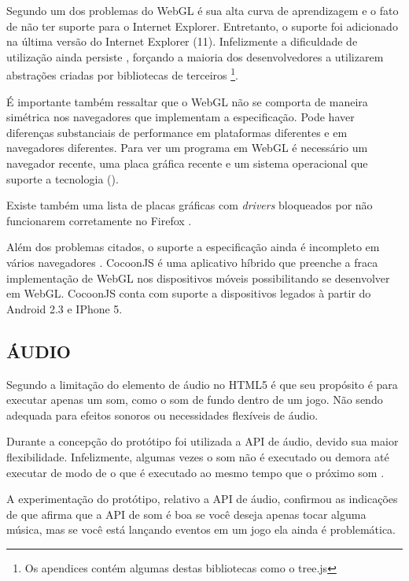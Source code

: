 Segundo \citet{html5mostwanted} um dos problemas do WebGL é sua alta
curva de aprendizagem e o fato de não ter suporte para o Internet
Explorer. Entretanto, o suporte foi adicionado na última versão do
Internet Explorer (11). Infelizmente a dificuldade de utilização
ainda persiste , forçando a maioria dos desenvolvedores a utilizarem
abstrações criadas por bibliotecas de terceiros \footnote{Os apendices
contém algumas destas bibliotecas como o tree.js}.

É importante também ressaltar que o WebGL não se comporta de maneira
simétrica nos navegadores que implementam a especificação. Pode haver
diferenças substanciais de performance em plataformas diferentes e em
navegadores diferentes. Para ver um programa em WebGL é necessário um
navegador recente, uma placa gráfica recente e um sistema operacional
que suporte a tecnologia \autocite{html5mostwanted} ().

Existe também uma lista de placas gráficas com \textit{drivers}
bloqueados por não funcionarem corretamente no Firefox
\autocite[p.42]{3daps}.

Além dos problemas citados, o suporte a especificação ainda é
incompleto em vários navegadores .
CocoonJS é uma aplicativo híbrido que preenche a fraca implementação
de WebGL nos dispositivos móveis possibilitando se desenvolver em
WebGL. CocoonJS conta com suporte a dispositivos legados à partir do
Android 2.3 e IPhone 5.

\subsection{ÁUDIO}

Segundo \citet{html5mostwanted} a limitação do elemento de áudio no
HTML5 é que seu propósito é para executar apenas um som, como o som
de fundo dentro de um jogo. Não sendo adequada para efeitos sonoros
ou necessidades flexíveis de áudio.

Durante a concepção do protótipo foi utilizada a API de áudio, devido
sua maior flexibilidade. Infelizmente, algumas vezes o som não é
executado ou demora até executar de modo de o que é executado ao mesmo
tempo que o próximo som .

A experimentação do protótipo, relativo a API de áudio, confirmou
as indicações de \citet{html5mostwanted} que afirma que a API de som
é boa se você deseja apenas tocar alguma música, mas se você está
lançando eventos em um jogo ela ainda é problemática.

